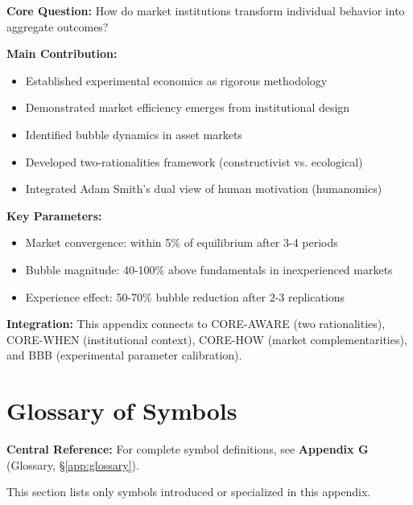 \begin{tcolorbox}[colback=green!10!white, colframe=green!75!black,
    title=\textbf{Appendix VS: Summary}]

\textbf{Core Question:} How do market institutions transform individual behavior
into aggregate outcomes?

\textbf{Main Contribution:}
\begin{itemize}[nosep]
    \item Established experimental economics as rigorous methodology
    \item Demonstrated market efficiency emerges from institutional design
    \item Identified bubble dynamics in asset markets
    \item Developed two-rationalities framework (constructivist vs. ecological)
    \item Integrated Adam Smith's dual view of human motivation (humanomics)
\end{itemize}

\textbf{Key Parameters:}
\begin{itemize}[nosep]
    \item Market convergence: within 5\% of equilibrium after 3-4 periods
    \item Bubble magnitude: 40-100\% above fundamentals in inexperienced markets
    \item Experience effect: 50-70\% bubble reduction after 2-3 replications
\end{itemize}

\textbf{Integration:} This appendix connects to CORE-AWARE (two rationalities),
CORE-WHEN (institutional context), CORE-HOW (market complementarities), and
BBB (experimental parameter calibration).

\end{tcolorbox}


\section{Glossary of Symbols}
\label{sec:vs-glossary}

\begin{tcolorbox}[colback=blue!5!white, colframe=blue!75!black]
\textbf{Central Reference:} For complete symbol definitions, see
\textbf{Appendix G} (Glossary, \S\ref{app:glossary}).

This section lists only symbols introduced or specialized in this appendix.
\end{tcolorbox}

